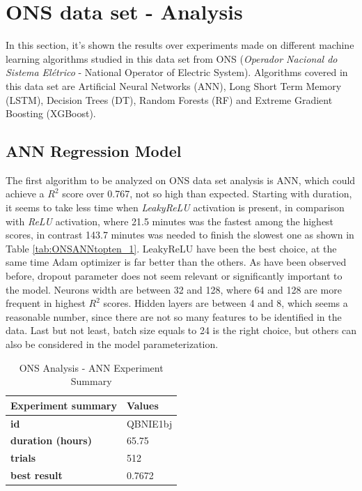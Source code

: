 \section{ONS data set - Analysis}

In this section, it's shown the results over experiments made on different machine learning algorithms studied in this data set from ONS (\emph{Operador Nacional do Sistema Elétrico} - National Operator of Electric System). Algorithms covered in this data set are Artificial Neural Networks (ANN), Long Short Term Memory (LSTM), Decision Trees (DT), Random Forests (RF) and Extreme Gradient Boosting (XGBoost).


\subsection{ANN Regression Model} \label{subsection:ANN Regression Model - ONS}
The first algorithm to be analyzed on ONS data set analysis is ANN, which could achieve a $R^2$ score over 0.767, not so high than expected. Starting with duration, it seems to take less time when \textit{LeakyReLU} activation is present, in comparison with \textit{ReLU} activation, where 21.5 minutes was the fastest among the highest scores, in contrast 143.7 minutes was needed to finish the slowest one as shown in Table \ref{tab:ONSANNtopten_1}.
LeakyReLU have been the best choice, at the same time Adam optimizer is far better than the others. As have been observed before, dropout parameter does not seem relevant or significantly important to the model. Neurons width are between 32 and 128, where 64 and 128 are more frequent in highest $R^2$ scores. Hidden layers are between 4 and 8, which seems a reasonable number, since there are not so many features to be identified in the data. Last but not least, batch size equals to 24 is the right choice, but others can also be considered in the model parameterization.




\begin{table}[!htpb]
\small
\centering
\caption{ONS Analysis - ANN Experiment Summary}
\label{tab:ONSANN_summary}
\begin{tabular}{ll} \hline
\textbf{Experiment summary} & \textbf{Values} \\ \hline
\textbf{id}                 & QBNIE1bj        \\
\textbf{duration (hours)}   & 65.75           \\
\textbf{trials}             & 512             \\
\textbf{best result}        & 0.7672         \\ \hline
\end{tabular}
\end{table}



